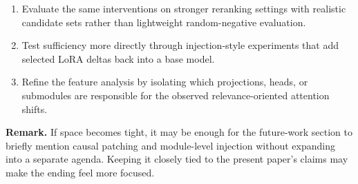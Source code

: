 \documentclass[10pt]{article}
\newcommand{\remark}[1]{{\color{blue}\textbf{Remark.} #1}}
\begin{document}
\begin{enumerate}[label=\textbf{\arabic*.}, leftmargin=*]
  \item Evaluate the same interventions on stronger reranking settings with realistic candidate sets rather than lightweight random-negative evaluation.
  \item Test sufficiency more directly through injection-style experiments that add selected LoRA deltas back into a base model.
  \item Refine the feature analysis by isolating which projections, heads, or submodules are responsible for the observed relevance-oriented attention shifts.
\end{enumerate}

\remark{If space becomes tight, it may be enough for the future-work section to briefly mention causal patching and module-level injection without expanding into a separate agenda. Keeping it closely tied to the present paper's claims may make the ending feel more focused.}



\end{document}
